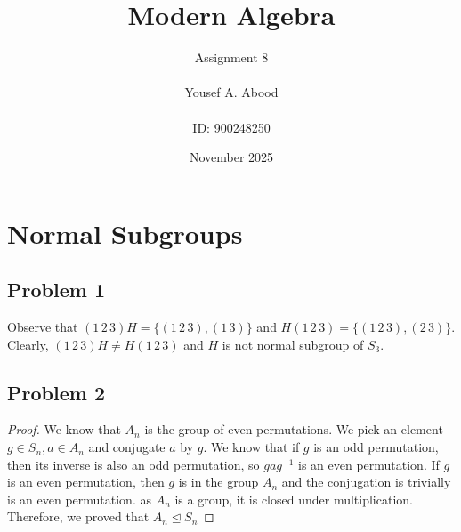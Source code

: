 \documentclass[a4paper,12pt]{article}
\title{Modern Algebra}
\author{Assignment 8\\ \\ Yousef A. Abood\\ \\ ID: 900248250}
\date{November 2025}
\begin{document}
\maketitle
\noindent\makebox[\linewidth]{\rule{15cm}{0.4pt}}
\section{Normal Subgroups}
\subsection*{Problem 1}
Observe that $(1 \, 2 \, 3)H =\{(1 \, 2 \, 3), (1 \, 3)\}$ and $H(1 \, 2 \, 3)= \{(1 \, 2 \, 3), (2 \, 3)\}$. Clearly, $(1 \, 2 \, 3)H \ne H(1 \, 2\, 3)$ and $H$ is not normal subgroup of $S_3$. 
\subsection*{Problem 2}
\begin{proof}
    We know that $A_n$ is the group of even permutations. We pick an element $g \in S_n, a \in A_n$ and conjugate $a$ by $g$. We know that if $g$ is an odd permutation, then its inverse is also an odd permutation, so $gag^{-1}$ is an even permutation. If $g$ is an even permutation, then $g$ is in the group $A_n$ and the conjugation is trivially is an even permutation. 
as $A_n$ is a group, it is closed under multiplication. Therefore, we proved that $A_n \unlhd S_n$
\end{proof}
\end{document}
